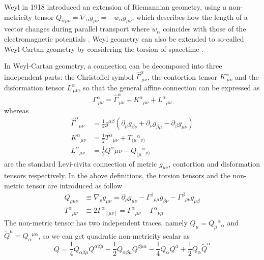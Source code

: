 \documentclass[a4paper,fleqn]{cas-sc}
\begin{document}
Weyl in 1918 introduced an extension of Riemannian geometry, using a non-metricity tensor $Q_{\alpha \mu \nu}=\nabla_\alpha g_{\mu \nu}=-w_\alpha g_{\mu \nu}$, which describes how the length of a vector changes during parallel transport where $w_\alpha$ coincides with those of the electromagnetic potentials \cite{Weyl:1918ib}. Weyl geometry can also be extended to so-called Weyl-Cartan geometry by considering the torsion of spacetime \cite{Xu_2019}.

In Weyl-Cartan geometry, a connection
can be decomposed into three independent parts: the Christoffel symbol $\hat{\Gamma}^\alpha_{\ \mu \nu}$, the contortion tensor $K^\alpha_{\ \mu \nu}$ and the disformation tensor $L^\alpha_{\ \mu \nu}$, so that the general affine connection can be expressed as \cite{J_rv_2018}
\begin{equation}
    \Gamma^\alpha_{\ \mu \nu}=\hat{\Gamma}^\alpha_{\ \mu \nu}+K^{\alpha}{}_{\mu \nu}+L^\alpha{}_{\mu \nu}
\end{equation}
whereas
\begin{align}
\hat{\Gamma}^\alpha{}_{\mu \nu}& =\frac{1}{2}g^{\alpha \beta}(\partial_\mu g_{\beta \nu}+\partial_\nu g_{\beta \mu}-\partial_\beta g_{\mu \nu}) \\
K^{\alpha }{}_{\mu \nu }& = \frac{1}{2}T^{\alpha }{}_{\mu \nu }+T_{(\mu}{}^{\alpha }{}_{\nu )} \\
L^{\alpha}{}_{\mu\nu}& = \frac{1}{2}Q^{\alpha}_{}{\mu\nu}-Q_{(\mu}{}^{\alpha }{}_{\nu)}
\end{align}
are the standard Levi-civita connection of metric $g_{\mu \nu}$, contortion and disformation tensors respectively.
In the above definitions, the torsion tensors and the non-metric tensor are introduced as follow
\begin{align}
Q_{\rho \mu\nu} &\equiv \nabla_{\rho} g_{\mu\nu} = \partial_\rho g_{\mu\nu} - \Gamma^\beta{}_{\rho \mu} g_{\beta\nu} - \Gamma^\beta{}_{\rho\nu} g_{\mu\beta}\\
T^{\alpha}{}_{\mu\nu} &\equiv 2\Gamma^{\alpha}{}_{[\mu\nu]} =\Gamma^{\alpha}{}_{\mu\nu}-\Gamma^{\alpha}{}_{\nu\mu}
\end{align}
The non-metric tensor has two independent traces, namely $Q_{\mu}=Q_{\mu}{}^{\alpha}{}_{\alpha}$ and $\tilde{Q}^{\mu}=Q_{\alpha}{}^{\mu \alpha}$, so we can get quadratic non-metricity scalar as
\begin{equation}
    Q=\dfrac{1}{4}Q_{\alpha\beta\mu}Q^{\alpha\beta\mu}-\dfrac{1}{2}Q_{\alpha\beta\mu}Q^{\beta\mu\alpha}-\dfrac{1}{4}Q_{\alpha}Q^{\alpha}+\dfrac{1}{2}Q_{\alpha}\tilde{Q}^\alpha\label{Qscalar} 
\end{equation} 
\end{document}
